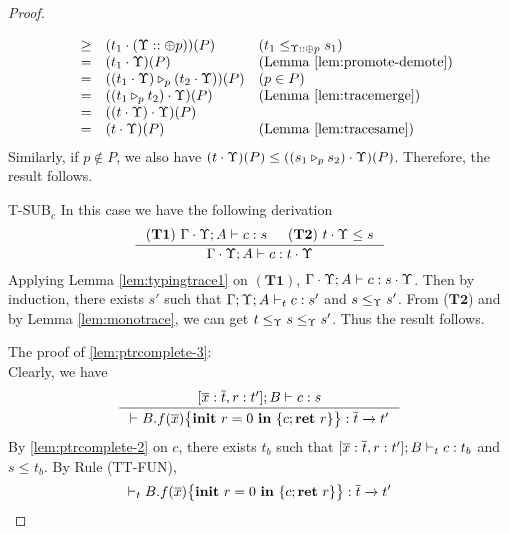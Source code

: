 {{{\begin{proof}
\begin{ProofEnumDesc}
$$\begin{array}{rlll}
&\geq&(t_1\cdot(\trace::\tplus{p}))(P) & (t_1 \leq_{\trace::\tplus{p}} s_1)\\
& = & (t_1\cdot\trace)(P) &(\textrm{Lemma \ref{lem:promote-demote}})\\
& = & (\omerge{p}{(t_1\cdot\trace)}{(t_2\cdot\trace)})(P)&(p\in P)\\
& = & ((\omerge{p}{t_1}{t_2})\cdot\trace)(P)& (\textrm{Lemma \ref{lem:tracemerge}})\\
& = & ((t\cdot\trace)\cdot\trace)(P)&\\
& = & (t\cdot\trace)(P)& (\textrm{Lemma \ref{lem:tracesame}})\\
\end{array}
$$
Similarly, if $p\notin P$, we also have $(t \cdot \trace)(P)\leq ((\omerge{p}{s_1}{s_2})\cdot\trace)(P)$.
Therefore, the result follows.

\item[T-SUB$_c$] In this case we have the following derivation
\begin{equation*}
\inference
{(\mathbf{T1})~\Gamma\cdot\trace; A\vdash c : s & (\mathbf{T2})~ t\cdot\trace \leq s}
{\Gamma\cdot\trace; A\vdash c : t\cdot \trace}
\end{equation*}
Applying Lemma \ref{lem:typingtrace1} on $(\mathbf{T1})$, $\Gamma\cdot\trace; A\vdash c : s\cdot\trace$.
Then by induction, there exists $s'$ such that $\Gamma;\trace; A\vdash_{t} c : s'$ and $s \leq_{\trace} s' $.
From ($\mathbf{T2}$) and by Lemma \ref{lem:monotrace}, we can get $t\leq_{\trace} s\leq_{\trace} s'$.  Thus the result follows.

\end{ProofEnumDesc}
The proof of \ref{lem:ptrcomplete-3}: \\
Clearly, we have
\begin{equation*}
\inference
{
[\overline{x}: \overline{t}, \lpRES: t']; B \vdash c : s
}
{\vdash \lpPROG{B.f}{\overline{x}}{c}{\lpRES} :  \overline{t}\xrightarrow{} t'}
\end{equation*}
By \ref{lem:ptrcomplete-2} on $c$, there exists $t_b$ such that $[\overline{x}: \overline{t}, \lpRES: t']; B \vdash_{t} c : t_b$ and $s \leq_{} t_b $.
By Rule {(TT-FUN)},
$$\vdash_{t} \lpPROG{B.f}{\overline{x}}{c}{\lpRES} :  \overline{t}\xrightarrow{} t'$$
\end{proof}



}}}
